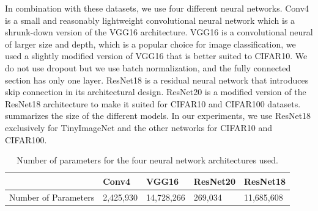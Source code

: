 In combination with these datasets, we use four different neural networks. Conv4
is a small and reasonably lightweight convolutional neural network which is a
shrunk-down version of the VGG16 architecture. VGG16 is a convolutional neural
of larger size and depth, which is a popular choice for image classification, we
used a slightly modified version of VGG16 that is better suited to CIFAR10. We
do not use dropout but we use batch normalization, and the fully connected
section has only one layer. ResNet18 is a residual neural network that
introduces skip connection in its architectural design. ResNet20 is a modified
version of the ResNet18 architecture to make it suited for CIFAR10 and CIFAR100
datasets.  summarizes the size of the different
models. In our experiments, we use ResNet18 exclusively for TinyImageNet and the
other networks for CIFAR10 and CIFAR100.\\


\begin{table}[h]
  \centering
  \begin{tabular}{lllll}
  \cline{2-5}
                       & Conv4     & VGG16      & ResNet20 & ResNet18   \\ \hline
  Number of Parameters & 2,425,930 & 14,728,266 & 269,034  & 11,685,608 \\ \hline
  \end{tabular}
  \caption{\centering Number of parameters for the four neural network architectures used.}
  \label{tab:chap1:networks_size}
\end{table}

